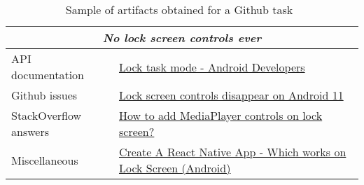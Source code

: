 \begin{table}[H]
\centering    
\begin{scriptsize}
\begin{threeparttable}
\begin{tabular}{l|l}

\hline

\multicolumn{2}{c}{\textit{No lock screen controls ever}}  \\

\hline
\hline

\multirow{1}{*}{API documentation}
& \href{https://developer.android.com/work/dpc/dedicated-devices/lock-task-mode}{Lock task mode - Android Developers} \\

\multirow{1}{*}{Github issues}
& \href{https://github.com/AntennaPod/AntennaPod/issues/4448}{Lock screen controls disappear on Android 11 } \\


\multirow{1}{*}{StackOverflow answers}
& \href{https://stackoverflow.com/questions/22084307/how-to-add-mediaplayer-controls-on-lock-screen}{How to add MediaPlayer controls on lock screen?} 
\\



\multirow{1}{*}{Miscellaneous}
& \href{https://tinyurl.com/lock-task}{Create A React Native App - Which works on Lock Screen (Android) } \\

\hline


\end{tabular}
\end{threeparttable}
\end{scriptsize}
\caption{Sample of artifacts obtained for a Github task~\cite{git3578} }
\label{tbl:googlesearch-example-git}
\end{table}

